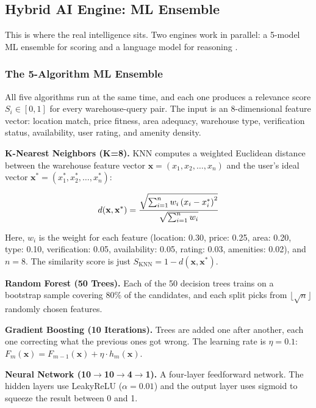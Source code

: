\documentclass[pdflatex,sn-mathphys-num]{sn-jnl}
\theoremstyle{thmstyleone}
\theoremstyle{thmstyletwo}
\theoremstyle{thmstylethree}
\begin{document}

\subsection{Hybrid AI Engine: ML Ensemble}%
\label{subsec:hybrid}

This is where the real intelligence sits.
Two engines work in parallel: a 5-model ML ensemble for
scoring and a language model for reasoning
\cite{b10, b3}.

\subsubsection{The 5-Algorithm ML Ensemble}%
\label{subsubsec:ml5}

All five algorithms run at the same time, and each one
produces a relevance score $S_i \in [0, 1]$ for every
warehouse-query pair.
The input is an 8-dimensional feature vector: location match,
price fitness, area adequacy, warehouse type, verification
status, availability, user rating, and amenity density.

\textbf{K-Nearest Neighbors (K=8).}
KNN computes a weighted Euclidean distance between the
warehouse feature vector
$\mathbf{x} = (x_1, x_2, \ldots, x_n)$
and the user's ideal vector
$\mathbf{x}^* = (x_1^*, x_2^*, \ldots, x_n^*)$:

\begin{equation}
d(\mathbf{x}, \mathbf{x}^*)
  = \frac{%
      \sqrt{\sum_{i=1}^{n} w_i \left(x_i - x_i^*\right)^2}%
    }{%
      \sqrt{\sum_{i=1}^{n} w_i}%
    }
\label{eq:knn}
\end{equation}

\noindent
Here, $w_i$ is the weight for each feature
(location: 0.30, price: 0.25, area: 0.20, type: 0.10,
verification: 0.05, availability: 0.05, rating: 0.03,
amenities: 0.02), and $n = 8$.
The similarity score is just
$S_{\text{KNN}} = 1 - d(\mathbf{x}, \mathbf{x}^*)$.

\textbf{Random Forest (50 Trees).}
Each of the 50 decision trees trains on a bootstrap sample
covering 80\% of the candidates, and each split picks from
$\lfloor\sqrt{n}\rfloor$ randomly chosen features.

\textbf{Gradient Boosting (10 Iterations).}
Trees are added one after another, each one correcting what
the previous ones got wrong.
The learning rate is $\eta = 0.1$:
$F_m(\mathbf{x}) = F_{m-1}(\mathbf{x})
  + \eta \cdot h_m(\mathbf{x})$.

\textbf{Neural Network
(10$\rightarrow$10$\rightarrow$4$\rightarrow$1).}
A four-layer feedforward network.
The hidden layers use LeakyReLU ($\alpha = 0.01$) and the
output layer uses sigmoid to squeeze the result between 0
and 1.
\end{document}

